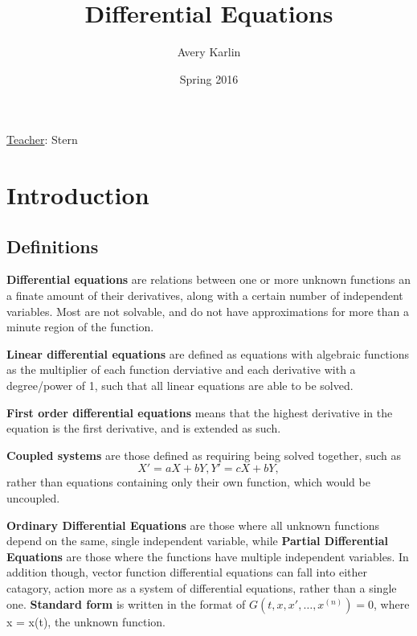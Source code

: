 \documentclass[11 pt, twoside]{article}
\begin{document}
\title{Differential Equations}
\author{Avery Karlin}
\date{Spring 2016}
\newcommand{\teacher}{Stern}

\maketitle
\newpage
\hypertarget{content}{\tableofcontents}
\vspace{11pt}
\noindent
\underline{Teacher}: \teacher
\newpage

\section{Introduction}

\subsection{Definitions}

\textbf{Differential equations} are relations between one or more unknown functions an a finate amount of their derivatives, along with a certain number of independent variables. Most are not solvable, and do not have approximations for more than a minute region of the function.

\textbf{Linear differential equations} are defined as equations with algebraic functions as the multiplier of each function derviative and each derivative with a degree/power of 1, such that all linear equations are able to be solved.

\textbf{First order differential equations} means that the highest derivative in the equation is the first derivative, and is extended as such.

\textbf{Coupled systems} are those defined as requiring being solved together, such as $$X' = aX + bY, Y' = cX + bY,$$ rather than equations containing only their own function, which would be uncoupled.

\textbf{Ordinary Differential Equations} are those where all unknown functions depend on the same, single independent variable, while \textbf{Partial Differential Equations} are those where the functions have multiple independent variables. In addition though, vector function differential equations can fall into either catagory, action more as a system of differential equations, rather than a single one. \textbf{Standard form} is written in the format of $G(t, x, x', \dots, x^{(n)}) = 0$, where x = x(t), the unknown function.
\end{document}
